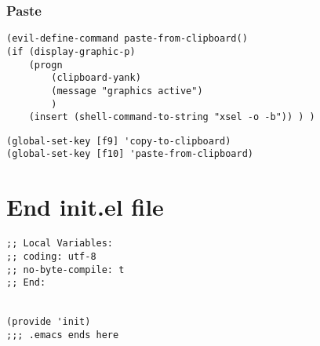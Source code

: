 \documentclass[11pt]{article}
\begin{document}
\subsubsection*{Paste}
\label{sec:org5b56695}

\begin{verbatim}
(evil-define-command paste-from-clipboard()
(if (display-graphic-p)
    (progn
        (clipboard-yank)
        (message "graphics active")
        )
    (insert (shell-command-to-string "xsel -o -b")) ) )
\end{verbatim}

\begin{verbatim}
(global-set-key [f9] 'copy-to-clipboard)
(global-set-key [f10] 'paste-from-clipboard)
\end{verbatim}


\section*{End init.el file}
\label{sec:orgae4be57}
\begin{verbatim}
;; Local Variables:
;; coding: utf-8
;; no-byte-compile: t
;; End:


(provide 'init)
;;; .emacs ends here

\end{verbatim}
\end{document}
